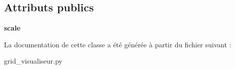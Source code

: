 \subsection*{Attributs publics}
\begin{DoxyCompactItemize}
\item 
\mbox{\label{classgrid__visualiseur_1_1MyPainter_a8edb92d9f22e2fbdf9a12e70033f6e66}} 
{\bfseries scale}
\end{DoxyCompactItemize}


La documentation de cette classe a été générée à partir du fichier suivant \+:\begin{DoxyCompactItemize}
\item 
grid\+\_\+visualiseur.\+py\end{DoxyCompactItemize}
